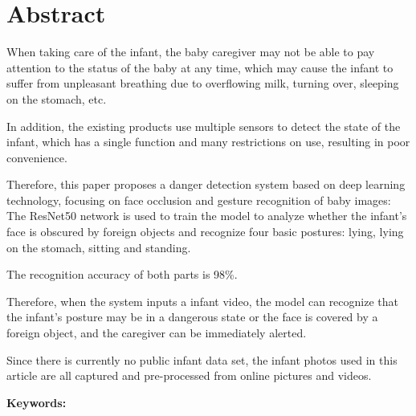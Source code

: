 \documentclass[class=NCU_thesis, crop=false]{standalone}
\begin{document}
\chapter{Abstract}
When taking care of the infant, the baby caregiver may not be able to pay attention to the status of the baby at any time, 
which may cause the infant to suffer from unpleasant breathing due to overflowing milk, turning over, sleeping on the stomach, etc.

In addition, the existing products use multiple sensors to detect the state of the infant, 
which has a single function and many restrictions on use, resulting in poor convenience.

Therefore, this paper proposes a danger detection system based on deep learning technology, 
focusing on face occlusion and gesture recognition of baby images:
The ResNet50 network is used to train the model to analyze whether the infant's face is obscured by foreign objects 
and recognize four basic postures: lying, lying on the stomach, sitting and standing. 

The recognition accuracy of both parts is 98\%.

Therefore, when the system inputs a infant video, 
the model can recognize that the infant's posture may be in a dangerous state or the face is covered by a foreign object, 
and the caregiver can be immediately alerted.

Since there is currently no public infant data set, 
the infant photos used in this article are all captured and pre-processed from online pictures and videos.

\vspace{2em}
\noindent \textbf{Keywords:} \keywordsEn{} %
\end{document}
